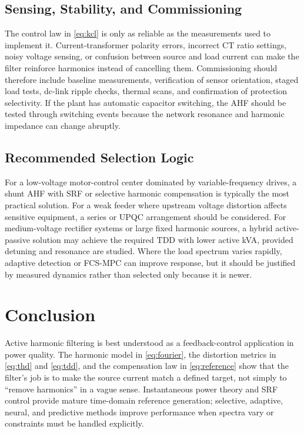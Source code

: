 \documentclass[conference]{IEEEtran}
\newcommand{\TDD}{\mathrm{TDD}}
\begin{document}
\subsection{Sensing, Stability, and Commissioning}
The control law in \eqref{eq:kcl} is only as reliable as the measurements used to implement it. Current-transformer polarity errors, incorrect CT ratio settings, noisy voltage sensing, or confusion between source and load current can make the filter reinforce harmonics instead of cancelling them. Commissioning should therefore include baseline measurements, verification of sensor orientation, staged load tests, dc-link ripple checks, thermal scans, and confirmation of protection selectivity. If the plant has automatic capacitor switching, the AHF should be tested through switching events because the network resonance and harmonic impedance can change abruptly.

\subsection{Recommended Selection Logic}
For a low-voltage motor-control center dominated by variable-frequency drives, a shunt AHF with SRF or selective harmonic compensation is typically the most practical solution. For a weak feeder where upstream voltage distortion affects sensitive equipment, a series or UPQC arrangement should be considered. For medium-voltage rectifier systems or large fixed harmonic sources, a hybrid active-passive solution may achieve the required $\TDD$ with lower active kVA, provided detuning and resonance are studied. Where the load spectrum varies rapidly, adaptive detection or FCS-MPC can improve response, but it should be justified by measured dynamics rather than selected only because it is newer.

\section{Conclusion}
Active harmonic filtering is best understood as a feedback-control application in power quality. The harmonic model in \eqref{eq:fourier}, the distortion metrics in \eqref{eq:thd} and \eqref{eq:tdd}, and the compensation law in \eqref{eq:reference} show that the filter's job is to make the source current match a defined target, not simply to ``remove harmonics'' in a vague sense. Instantaneous power theory and SRF control provide mature time-domain reference generation; selective, adaptive, neural, and predictive methods improve performance when spectra vary or constraints must be handled explicitly.
\end{document}
